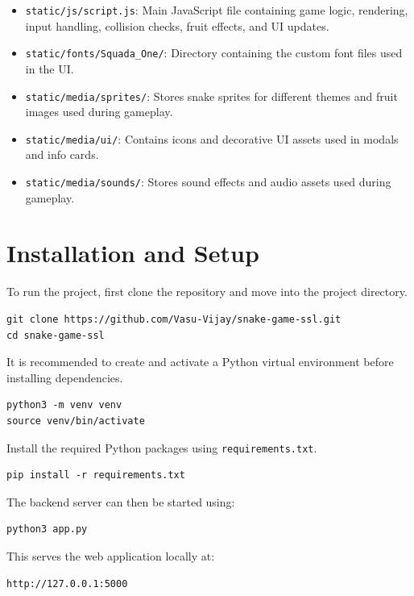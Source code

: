 \documentclass[12pt]{article}
\begin{document}
\begin{itemize}
    \item \texttt{static/js/script.js}: Main JavaScript file containing game logic, rendering, input handling, collision checks, fruit effects, and UI updates.
    \item \texttt{static/fonts/Squada\_One/}: Directory containing the custom font files used in the UI.
    \item \texttt{static/media/sprites/}: Stores snake sprites for different themes and fruit images used during gameplay.
    \item \texttt{static/media/ui/}: Contains icons and decorative UI assets used in modals and info cards.
    \item \texttt{static/media/sounds/}: Stores sound effects and audio assets used during gameplay.
\end{itemize}

\section{Installation and Setup}

To run the project, first clone the repository and move into the project directory.

\begin{verbatim}
git clone https://github.com/Vasu-Vijay/snake-game-ssl.git
cd snake-game-ssl
\end{verbatim}

It is recommended to create and activate a Python virtual environment before installing dependencies.

\begin{verbatim}
python3 -m venv venv
source venv/bin/activate
\end{verbatim}

Install the required Python packages using \texttt{requirements.txt}.

\begin{verbatim}
pip install -r requirements.txt
\end{verbatim}

The backend server can then be started using:

\begin{verbatim}
python3 app.py
\end{verbatim}

This serves the web application locally at:

\begin{verbatim}
http://127.0.0.1:5000
\end{verbatim}
\end{document}
